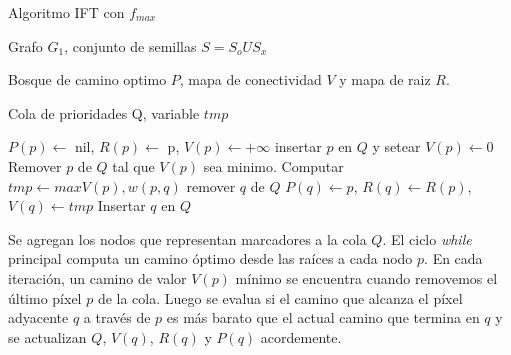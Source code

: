 \documentclass[a4paper,10pt]{article}
\begin{document}
\begin{algorithm}
    \caption{Algoritmo IFT con $f_{max}$}
    \label{fig:IFTrace-IFT-algorithm}
    \begin{algorithmic}
        \Require\hspace{\algorithmicindent}\hspace{\algorithmicindent}Grafo $G_{1}$, conjunto de semillas $S = S_{o} U S_{x}$

        \Ensure \hspace{\algorithmicindent}\hspace{0.23cm} Bosque de camino optimo $P$, mapa de conectividad $V$ 
        \State\hspace{\algorithmicindent}\hspace{\algorithmicindent}\hspace{\algorithmicindent}\hspace{0.3cm} y mapa de raiz $R$.

        \Auxiliary\hspace{\algorithmicindent} Cola de prioridades Q, variable $tmp$

        \State

            \State $P(p) \gets$ nil, $R(p) \gets$ p, $V(p) \gets + \infty$
             insertar $p$ en $Q$ y setear $V(p) \gets 0$ \EndIf
        \EndFor
            \State Remover $p$ de $Q$ tal que $V(p)$ sea minimo.
                \State Computar $tmp \gets max{V(p), w(p,q)}$
                     remover $q$ de $Q$ \EndIf
                    \State $P(q) \gets p$, $R(q) \gets R(p)$, $V(q) \gets tmp$
                    \State Insertar $q$ en $Q$
                \EndIf
            \EndFor
        \EndWhile 
    \end{algorithmic}
\end{algorithm}



Se agregan 
los nodos que representan marcadores a la cola $Q$. El ciclo \textit{while}
principal computa un camino óptimo desde las raíces a cada nodo $p$. En 
cada iteración, un camino de valor $V(p)$ mínimo se encuentra cuando
removemos el último píxel $p$ de la cola. Luego se evalua si el camino que
alcanza el píxel adyacente $q$ a través de $p$ es más barato que el actual 
camino que termina en $q$ y se actualizan $Q$, $V(q)$, $R(q)$ y $P(q)$ 
acordemente.
\end{document}
